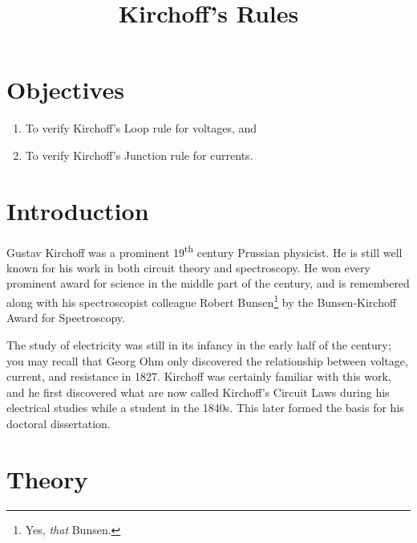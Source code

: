 \documentclass[12pt]{article}
\title{Kirchoff's Rules}
\author{}
\date{}
\begin{document}
\maketitle

\section{Objectives}
\label{sec:objectives}

\begin{enumerate}
\item To verify Kirchoff's Loop rule for voltages, and
\item To verify Kirchoff's Junction rule for currents.
\end{enumerate}

\section{Introduction}
\label{sec:introduction}

Gustav Kirchoff was a prominent 19\textsuperscript{th} century
Prussian physicist.  He is still well known for his work in both
circuit theory and spectroscopy.  He won every prominent award for
science in the middle part of the century, and is remembered along
with his spectroscopist colleague Robert Bunsen\footnote{Yes,
  \textit{that} Bunsen.} by the Bunsen-Kirchoff Award for
Spectroscopy.

The study of electricity was still in its infancy in the early half of
the century; you may recall that Georg Ohm only discovered the
relationship between voltage, current, and resistance in 1827.
Kirchoff was certainly familiar with this work, and he first
discovered what are now called Kirchoff's Circuit Laws during his
electrical studies while a student in the 1840s.  This later formed
the basis for his doctoral dissertation.

\section{Theory}
\label{sec:theory}
\end{document}
